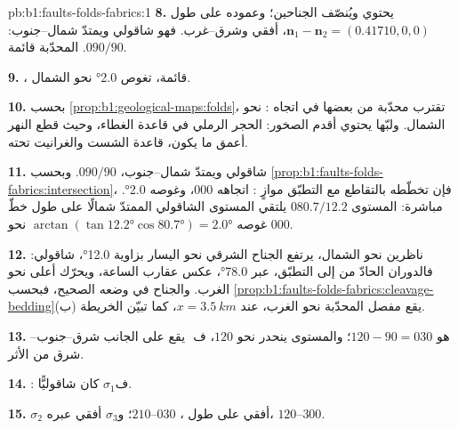 \begin{solution}{pb:b1:faults-folds-fabrics:1}
\textbf{8.}  يحتوي  ويُنصّف الجناحين؛
وعموده على طول $\mathbf n_1 - \mathbf n_2 = (0.41710, 0, 0)$، أفقي
وشرق--غرب. فهو شاقولي ويمتدّ شمال--جنوب: $090/90$.  المحدّبة قائمة.

\textbf{9.} ، قائمة، تغوص \ang{2.0} نحو الشمال.

\textbf{10.} بحسب \cref{prop:b1:geological-maps:folds}، تقترب   محدّبة من بعضها في اتجاه : نحو الشمال. ولبّها يحتوي أقدم الصخور: الحجر الرملي في قاعدة الغطاء، وحيث قطع النهر أعمق ما يكون، قاعدة الشست والغرانيت تحته.

\textbf{11.}  شاقولي ويمتدّ شمال--جنوب، $090/90$. وبحسب \cref{prop:b1:faults-folds-fabrics:intersection}، فإن تخطّطه بالتقاطع مع التطبّق موازٍ : اتجاهه $000$، وغوصه \ang{2.0}. مباشرة: المستوى $080.7/12.2$ يلتقي المستوى الشاقولي الممتدّ شمالًا على طول خطّ غوصه $\arctan(\tan\ang{12.2}
\cos\ang{80.7}) = \ang{2.0}$ نحو $000$.

\textbf{12.} ناظرين نحو الشمال، يرتفع الجناح الشرقي نحو اليسار بزاوية \ang{12.0}،  شاقولي: فالدوران الحادّ من  إلى التطبّق، عبر \ang{78.0}، عكس عقارب الساعة، ويحرّك أعلى  نحو الغرب. والجناح في وضعه الصحيح، فبحسب \cref{prop:b1:faults-folds-fabrics:cleavage-bedding}(ب) يقع مفصل  المحدّبة نحو الغرب، عند $x = \qty{3.5}{km}$، كما تبيّن الخريطة.

\textbf{13.}  هو $120 - 90 = 030$؛ والمستوى ينحدر نحو $120$، ف\,\,
 يقع على الجانب شرق--جنوب--شرق من الأثر.

\textbf{14.} : ف$\sigma_1$ كان شاقوليًّا.

\textbf{15.} $\sigma_2$ أفقي على طول ، $030$--$210$؛
و$\sigma_3$ أفقي عبره، $120$--$300$.


\end{solution}

